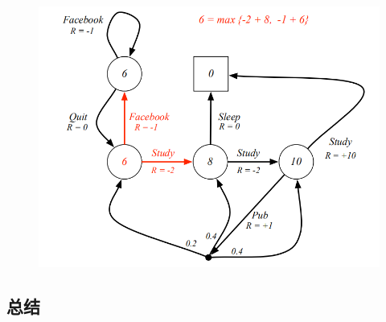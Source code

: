 \documentclass[UTF8,a4paper,12pt]{ctexbook}
\begin{document}
				\begin{figure}[H]
					\centering
					\includegraphics[width=\linewidth]{qVStar03}
				\end{figure}
	
	
		\subsection{总结}
			
\end{document}

